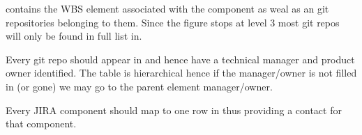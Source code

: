  contains the WBS element associated with the component as weal as an git repositories belonging to them.
 Since the figure stops at level 3 most git repos will only be found in full list in.

 Every git repo should appear in   and hence have a technical manager and product owner identified. The table is hierarchical hence if the manager/owner is not filled in (or gone) we may go to the parent element manager/owner.

 Every JIRA component should map to one row in  thus providing a contact for that component. 
